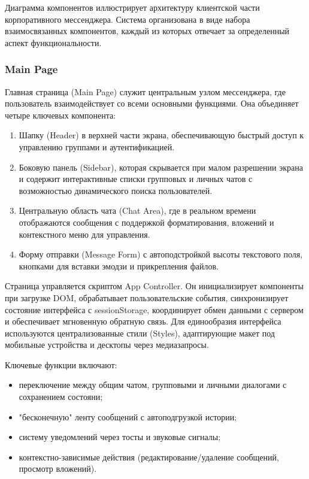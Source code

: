 Диаграмма компонентов иллюстрирует архитектуру клиентской части корпоративного мессенджера. Система организована в виде набора взаимосвязанных компонентов, каждый из которых отвечает за определенный аспект функциональности.

\subsubsection{Main Page}
Главная страница (Main Page) служит центральным узлом мессенджера, где пользователь взаимодействует со всеми основными функциями. Она объединяет четыре ключевых компонента: 
\begin{enumerate}
	\item Шапку (Header) в верхней части экрана, обеспечивающую быстрый доступ к управлению группами и аутентификацией.
	\item Боковую панель (Sidebar), которая скрывается при малом разрешении экрана и содержит интерактивные списки групповых и личных чатов с возможностью динамического поиска пользователей.
	\item Центральную область чата (Chat Area), где в реальном времени отображаются сообщения с поддержкой форматирования, вложений и контекстного меню для управления.
	\item Форму отправки (Message Form) с автоподстройкой высоты текстового поля, кнопками для вставки эмодзи и прикрепления файлов.
\end{enumerate}

Страница управляется скриптом App Controller. Он инициализирует компоненты при загрузке DOM, обрабатывает пользовательские события, синхронизирует состояние интерфейса с sessionStorage, координирует обмен данными с сервером и обеспечивает мгновенную обратную связь. Для единообразия интерфейса используются централизованные стили (Styles), адаптирующие макет под мобильные устройства и десктопы через медиазапросы.

Ключевые функции включают: 
\begin {itemize}
	\item переключение между общим чатом, групповыми и личными диалогами с сохранением состояни;
	\item "бесконечную" ленту сообщений с автоподгрузкой истории; 
	\item систему уведомлений через тосты и звуковые сигналы; 
	\item контекстно-зависимые действия (редактирование/удаление сообщений, просмотр вложений). 
\end{itemize}

